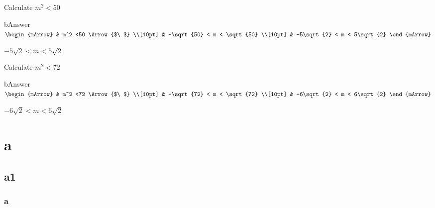 \begin{mtask}
    \task Calculate $ m^2 < 50$
              \begin{envOut}[equal height group=A-Rev-1]{bAnswer}
			       $\begin{mArrow}
			             & m^2 <50      \Arrow{$\ $} \\[10pt]
                         & -\sqrt{50} < m < \sqrt{50}	  \\[10pt] 
					     & -5\sqrt{2} < m < 5\sqrt{2}
	                \end{mArrow}$
              \end{envOut}			  
			  \begin{exercise}\begin{shortsolution}  
				       $-5\sqrt{2} < m < 5\sqrt{2}$
			  \end{shortsolution}\end{exercise}		

    \task Calculate $ m^2 < 72$
              \begin{envOut}[equal height group=A-Rev-1]{bAnswer}
			       $\begin{mArrow}
			             & m^2 <72      \Arrow{$\ $} \\[10pt]
                         & -\sqrt{72} < m < \sqrt{72}	  \\[10pt] 
					     & -6\sqrt{2} < m < 6\sqrt{2}
	                \end{mArrow}$
              \end{envOut}			  
			  \begin{exercise}\begin{shortsolution}  
				       $-6\sqrt{2} < m < 6\sqrt{2}$
			  \end{shortsolution}\end{exercise}		
\end{mtask}
\clearpage

\section{a}
\subsection{a1}
\subsubsection{a}
\setcounter{exercise}{0}

